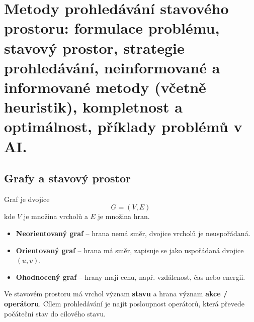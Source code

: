 \section{Metody prohledávání stavového prostoru: formulace problému, stavový prostor, strategie prohledávání, neinformované a informované metody (včetně heuristik), kompletnost a optimálnost, příklady problémů v AI.}

\subsection*{Grafy a stavový prostor}
Graf je dvojice
\begin{equation}
    G=(V,E)
\end{equation}
kde \(V\) je množina vrcholů a \(E\) je množina hran.

\begin{itemize}
    \item \textbf{Neorientovaný graf} -- hrana nemá směr, dvojice vrcholů je neuspořádaná.
    \item \textbf{Orientovaný graf} -- hrana má směr, zapisuje se jako uspořádaná dvojice \((u,v)\).
    \item \textbf{Ohodnocený graf} -- hrany mají cenu, např. vzdálenost, čas nebo energii.
\end{itemize}

Ve stavovém prostoru má vrchol význam \textbf{stavu} a hrana význam
\textbf{akce / operátoru}. Cílem prohledávání je najít posloupnost operátorů,
která převede počáteční stav do cílového stavu.

